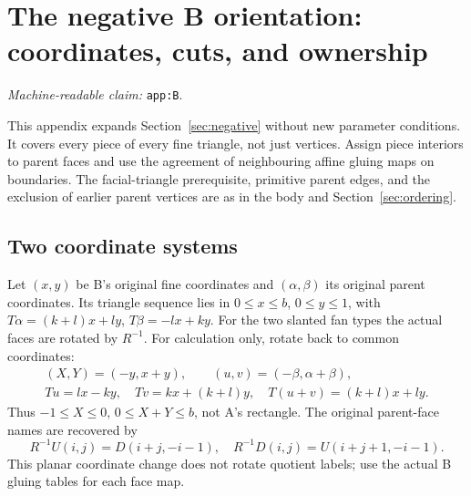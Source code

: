\documentclass[11pt]{amsart}
\newcommand{\record}[1]{\nolinkurl{#1}}
\newcommand{\claimid}[1]{\par\nopagebreak\noindent\textit{Machine-readable claim:} \record{#1}.\par}
\begin{document}
\clearpage
\section{The negative B orientation: coordinates, cuts, and ownership}\label{app:B}
\claimid{app:B}
This appendix expands Section~\ref{sec:negative} without new parameter conditions. It
covers every piece of every fine triangle, not just vertices. Assign
piece interiors to parent faces and use the agreement of neighbouring
affine gluing maps on boundaries. The facial-triangle prerequisite,
primitive parent edges, and the exclusion of earlier parent vertices
are as in the body and Section~\ref{sec:ordering}.

\subsection{Two coordinate systems}
Let $(x,y)$ be B's original fine coordinates and $(\alpha,\beta)$ its
original parent coordinates. Its triangle sequence lies in
$0\le x\le b$, $0\le y\le1$, with
$T\alpha=(k+l)x+ly$, $T\beta=-lx+ky$.
For the two slanted fan types the actual faces are rotated by $R^{-1}$.
For calculation only, rotate back to common coordinates:
\begin{equation}\label{eq:B1}
\begin{gathered}
(X,Y)=(-y,x+y),\qquad(u,v)=(-\beta,\alpha+\beta),\\
Tu=lx-ky,\quad Tv=kx+(k+l)y,\quad
T(u+v)=(k+l)x+ly.
\end{gathered}\tag{B1}
\end{equation}
Thus $-1\le X\le0$, $0\le X+Y\le b$, not A's rectangle.
The original parent-face names are recovered by
\begin{equation}\label{eq:B2}
R^{-1}U(i,j)=D(i+j,-i-1),\quad
R^{-1}D(i,j)=U(i+j+1,-i-1).\tag{B2}
\end{equation}
This planar coordinate change does not rotate quotient labels; use
the actual B gluing tables for each face map.
\end{document}
